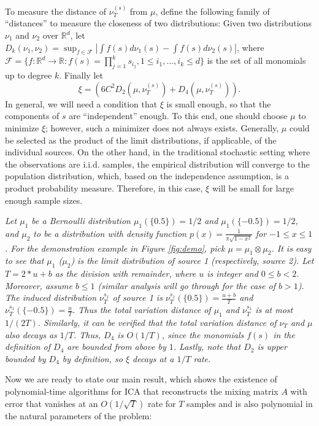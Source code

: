 \documentclass[twoside,11pt]{article}
\newcommand{\real}{\mathbb{R}}
\newcommand{\R}{\real}
\newcommand{\iid}{i.i.d.\xspace}
\begin{document}
To measure the distance of $\nu_T^{(s)}$ from $\mu$, define the following family of ``distances'' to measure the closeness of two distributions: Given two distributions $\nu_1$ and $\nu_2$ over $\R^d$, let $D_k(\nu_1,\nu_2) = \sup_{f\in\mathcal{F}} |\int f(s)d\nu_1(s) - \int f(s)d\nu_2(s)|$, where $\mathcal{F}=\{f:\R^d \to \R : f(s)=\prod_{j=1}^k s_{i_j}, 1 \le i_1,\ldots,i_k \le d\}$ is the set of all monomials up to degree $k$. Finally let
\begin{equation}
\label{eq:xi}
\xi = \left( 6C^2D_2(\mu, \nu_T^{(s)}) + D_4(\mu, \nu_T^{(s)})\right).
\end{equation}
In general, we will need a condition that $\xi$ is small enough, so that the components of $s$ are ``independent'' enough. To this end, one should choose
$\mu$ to minimize $\xi$; however, such a minimizer does not always exists.
Generally, $\mu$ could be selected as the product of the limit distributions, if applicable, of the individual sources. 
On the other hand, in the traditional stochastic setting where the observations are \iid samples, the empirical distribution will converge to the population distribution, which, based on the independence assumption, is a product probability measure. 
Therefore, in this case, $\xi$ will be small for large enough sample sizes. 
\begin{example}\em
Let $\mu_1$ be a Bernoulli distribution $\mu_1(\{0.5\}) = 1/2$ and $\mu_1(\{-0.5\}) = 1/2$, and $\mu_2$ to be a distribution with density function $p(x) = \frac{1}{\pi \sqrt{1-x^2}}$ for $-1\le x \le 1$. 
For the demonstration example in Figure \ref{fig:demo}, pick $\mu = \mu_1 \otimes \mu_2$.
It is easy to see that $\mu_1$ ($\mu_2$) is the limit distribution of source 1 (respectively, source 2). Let $T = 2*u + b$ as the division with remainder, where $u$ is integer and $0\le b<2$. 
Moreover, assume $b\le 1$ (similar analysis will go through for the case of $b>1$).  
The induced distribution $\nu_T^{s_1}$ of source 1 is $\nu_T^{s_1}(\{0.5\}) = \frac{u+b}{T}$ and $\nu_T^{s_1}(\{-0.5\}) = \frac{u}{T}$. 
Thus the total variation distance of $\mu_1$ and $\nu_T^{s_1}$ is at most $1/(2T)$. 
Similarly, it can be verified that the total variation distance of $\nu_T$ and $\mu$ also decays as $1/T$. 
Thus, $D_4$ is $O(1/T)$, since the monomials $f(s)$ in the definition
of $D_4$ are bounded from above by $1$.
Lastly, note that $D_2$ is upper bounded by $D_4$ by definition, so $\xi$ decays at a $1/T$ rate.
\end{example}

Now we are ready to state our main result, which shows the existence of polynomial-time algorithms for ICA that reconstructs the mixing matrix $A$ 
with error that vanishes at an $O(1/\sqrt{T})$ rate for $T$ samples and is also polynomial in the natural parameters of the problem:
\end{document}
